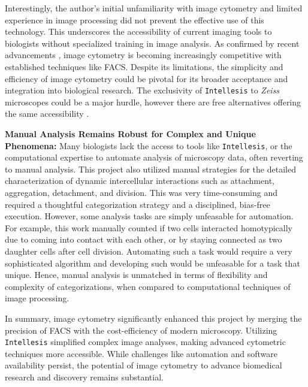 Interestingly, the author’s initial unfamiliarity with image cytometry and
limited experience in image processing did not prevent the effective use of this
technology. This underscores the accessibility of current imaging tools to
biologists without specialized training in image analysis. As confirmed by
recent advancements \cite{nittaRapidHighthroughputCell2023}, image cytometry is
becoming increasingly competitive with established techniques like \ac{FACS}.
Despite its limitations, the simplicity and efficiency of image cytometry could
be pivotal for its broader acceptance and integration into biological research.
The exclusivity of \texttt{Intellesis} to \textit{Zeiss} microscopes could be a
major hurdle, however there are free alternatives offering the same
accessibility \cite{bergIlastikInteractiveMachine2019}.



\textbf{Manual Analysis Remains Robust for Complex and Unique Phenomena:}
Many biologists lack the access to tools like \texttt{Intellesis}, or the
computational expertise to automate analysis of microscopy data, often reverting
to manual analysis. This project also utilized manual strategies for the
detailed characterization of dynamic intercellular interactions such as
attachment, aggregation, detachment, and division. This was very time-consuming
and required a thoughtful categorization strategy and a disciplined, bias-free
execution. However, some analysis tasks are simply unfeasable for automation.
For example, this work manually counted if two \INA cells interacted
homotypically due to coming into contact with each other, or by staying
connected as two daughter cells after cell division. Automating such a task
would require a very sophisticated algorithm and developing such would be
unfeasable for a task that unique. Hence, manual analysis is unmatched in terms
of flexibility and complexity of categorizations, when compared to computational
techniques of image processing.






In summary, image cytometry significantly enhanced this project by merging the
precision of \ac{FACS} with the cost-efficiency of modern microscopy. Utilizing
\texttt{Intellesis} simplified complex image analyses, making advanced
cytometric techniques more accessible. While challenges like automation and
software availability persist, the potential of image cytometry to advance
biomedical research and discovery remains substantial.




